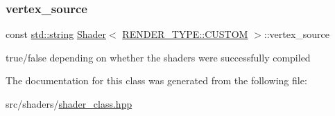 \subsubsection{\texorpdfstring{vertex\+\_\+source}{vertex\_source}}
{\footnotesize\ttfamily const \mbox{\hyperlink{glad_8h_ac83513893df92266f79a515488701770}{std\+::string}} \mbox{\hyperlink{classShader}{Shader}}$<$ \mbox{\hyperlink{shader__class_8hpp_a24e288e18eb7b6e01de7565001fedb60a72baef04098f035e8a320b03ad197818}{R\+E\+N\+D\+E\+R\+\_\+\+T\+Y\+P\+E\+::\+C\+U\+S\+T\+OM}} $>$\+::vertex\+\_\+source\hspace{0.3cm}{\ttfamily [protected]}}

true/false depending on whether the shaders were successfully compiled 

The documentation for this class was generated from the following file\+:\begin{DoxyCompactItemize}
\item 
src/shaders/\mbox{\hyperlink{shader__class_8hpp}{shader\+\_\+class.\+hpp}}\end{DoxyCompactItemize}
